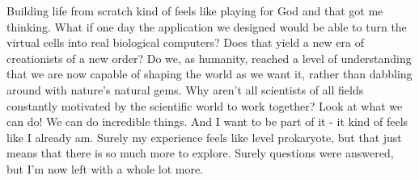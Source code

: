\documentclass{article}
\begin{document}
Building life from scratch kind of feels like playing for God and that got me thinking. What if one day the application we designed would be able to turn the virtual cells into real biological computers? Does that yield a new era of creationists of a new order? Do we, as humanity, reached a level of understanding that we are now capable of shaping the world as we want it, rather than dabbling around with nature's natural gems. Why aren't all scientists of all fields constantly motivated by the scientific world to work together? Look at what we can do! We can do incredible things. And I want to be part of it - it kind of feels like I already am. Surely my experience feels like level prokaryote, but that just means that there is so much more to explore. Surely questions were answered, but I'm now left with a whole lot more.
\end{document}
